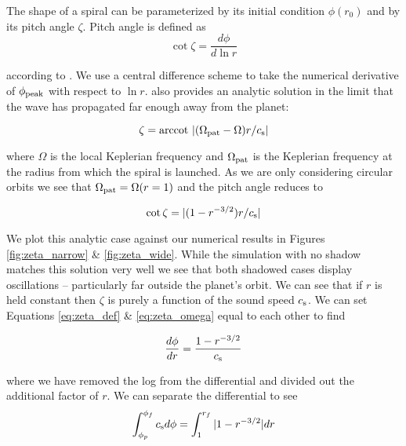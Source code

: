 \documentclass[twocolumn]{aastex631}
\begin{document}
The shape of a spiral can be parameterized by its initial condition $\phi(r_0)$ and by its pitch angle $\zeta$. Pitch angle
is defined as
\begin{equation}
    \cot \zeta = \frac{d\phi}{d \ln r}
    \label{eq:zeta_def}
\end{equation}

according to \citet{zhu2022}. We use a central difference scheme to take the numerical derivative of $\phi_{\rm peak}$ with respect to $\ln r$.
\citet{zhu2022} also provides an analytic solution in the limit that the wave has propagated far enough away from the planet:

\begin{equation}
    \zeta = \text{arccot}~|(\Omega_{\rm pat} - \Omega)r/c_{\rm s}|
\end{equation}

where $\Omega$ is the local Keplerian frequency and $\Omega_{\rm pat}$ is the Keplerian frequency at the
radius from which the spiral is launched. As we are only considering circular orbits we see that 
$\Omega_{\rm pat} = \Omega(r=1)$ and the pitch angle reduces to

\begin{equation}
    \cot \zeta = |(1-r^{-3/2}) r/c_{\rm s}|
    \label{eq:zeta_omega}
\end{equation}

We plot this analytic case against our numerical results in Figures \ref{fig:zeta_narrow} \& \ref{fig:zeta_wide}. While the simulation with
no shadow matches this solution very well we see that both shadowed cases display oscillations -- particularly far outside the planet's orbit.
We can see that if $r$ is held constant then $\zeta$ is purely a function of the sound speed $c_{\rm s}$. We can set
Equations \ref{eq:zeta_def} \& \ref{eq:zeta_omega} equal to each other to find

\begin{equation}
    \frac{d\phi}{d r} = \frac{1-r^{-3/2}}{c_{\rm s}}
\end{equation}

where we have removed the log from the differential and divided out the additional factor of $r$. We can separate the differential to see
\begin{equation}
    \int_{\phi_p}^{\phi_f} c_{\rm s} d \phi = \int_{1}^{r_f} |1-r^{-3/2}| d r
    \label{eq:analytic_shadow}
\end{equation}
\end{document}
